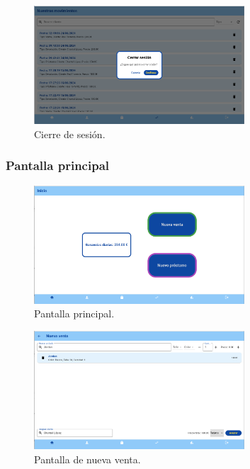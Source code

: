 \begin{figure}[H]
	\centering
	\includegraphics[width=0.7\textwidth]{imagenes/TerceraIteracion/logout.png}
	\caption{Cierre de sesión.}
\end{figure}

\subsubsection{Pantalla principal}

\begin{figure}[H]
	\centering
	\includegraphics[width=0.7\textwidth]{imagenes/TerceraIteracion/mainPage.png}
	\caption{Pantalla principal.}
\end{figure}

\begin{figure}[H]
	\centering
	\includegraphics[width=0.7\textwidth]{imagenes/TerceraIteracion/nuevaVenta.png}
	\caption{Pantalla de nueva venta.}
\end{figure}

